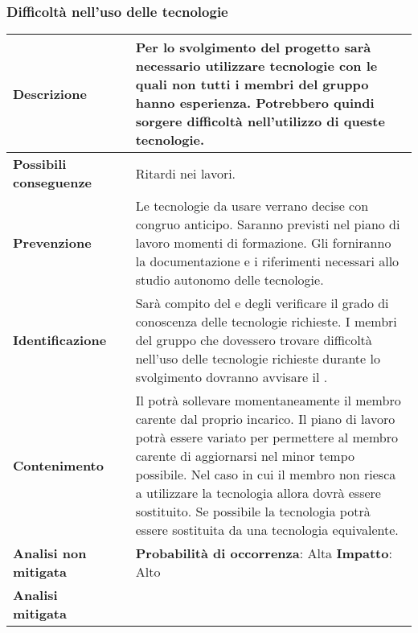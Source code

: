 \newpage
\subsubsection {Difficoltà nell'uso delle tecnologie}
\label{subsec:difficoltaTecnol}


\small
\begin{table}[H]
	\begin{center}			
		\begin{tabular}{p{2.5cm}p{0.5cm}p{11cm}}
			\arrayrulecolor{lightgray}
			
			\toprule				
			\textbf{Descrizione}
			& &
			Per lo svolgimento del progetto sarà necessario utilizzare tecnologie con le quali non tutti i membri del gruppo hanno esperienza. Potrebbero quindi sorgere difficoltà nell'utilizzo di queste tecnologie.
			\\
			\midrule
			\textbf{Possibili \newline conseguenze}
			& &
			Ritardi nei lavori.
			\\
			\midrule
			\textbf{Prevenzione}
			& &
			Le tecnologie da usare verrano decise con congruo anticipo. Saranno previsti nel piano di lavoro momenti di formazione. Gli \amministratori{} forniranno la documentazione e i riferimenti necessari allo studio autonomo delle tecnologie.
			\\
			\midrule
			\textbf{Identificazione}
			& &
			Sarà compito del \responsabilediprogetto{} e degli \amministratori{} verificare il grado di conoscenza delle tecnologie richieste. I membri del gruppo che dovessero trovare difficoltà nell'uso delle tecnologie richieste durante lo svolgimento dovranno avvisare il \responsabilediprogetto.
			\\
			\midrule
			\textbf{Contenimento}
			& &
			Il \responsabilediprogetto{} potrà sollevare momentaneamente il membro carente dal proprio incarico. Il piano di lavoro potrà essere variato per permettere al membro carente di aggiornarsi nel minor tempo possibile. Nel caso in cui il membro non riesca a utilizzare la tecnologia allora dovrà essere sostituito. Se possibile la tecnologia potrà essere sostituita da una tecnologia equivalente.
			\\
			\midrule
			\textbf{Analisi \newline non mitigata}
			& &
			\textbf{Probabilità di occorrenza}: Alta
			\newline
			\textbf{Impatto}: Alto
			\\
			\midrule
			\textbf{Analisi \newline mitigata}

\end{tabular}
\end{center}
\end{table}
